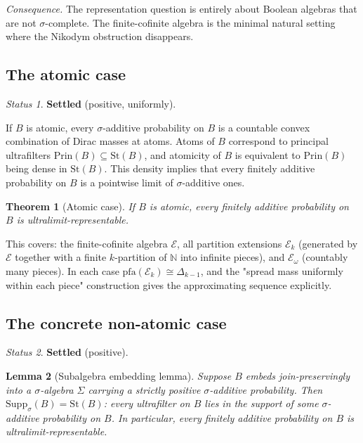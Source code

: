 \documentclass[11pt]{article}
\newtheorem{theorem}{Theorem}
\newtheorem{lemma}[theorem]{Lemma}
\theoremstyle{definition}
\theoremstyle{remark}
\newtheorem*{status}{Status}
\newcommand{\N}{\mathbb{N}}
\newcommand{\St}{\mathrm{St}}
\newcommand{\Prin}{\mathrm{Prin}}
\newcommand{\Supp}{\mathrm{Supp}_\sigma}
\newcommand{\pfa}{\mathrm{pfa}}
\begin{document}
\noindent
\textit{Consequence.} The representation question is entirely about Boolean algebras
that are not $\sigma$-complete. The finite-cofinite algebra is the minimal natural
setting where the Nikodym obstruction disappears.

\subsection{The atomic case}

\begin{status}
\textbf{Settled} (positive, uniformly).
\end{status}

If $B$ is atomic, every $\sigma$-additive probability on $B$ is a countable convex
combination of Dirac masses at atoms. Atoms of $B$ correspond to principal
ultrafilters $\Prin(B) \subseteq \St(B)$, and atomicity of $B$ is equivalent to
$\Prin(B)$ being dense in $\St(B)$. This density implies that every finitely
additive probability on $B$ is a pointwise limit of $\sigma$-additive ones.

\begin{theorem}[Atomic case]
If $B$ is atomic, every finitely additive probability on $B$ is ultralimit-representable.
\end{theorem}

This covers: the finite-cofinite algebra $\mathcal{E}$, all partition extensions
$\mathcal{E}_k$ (generated by $\mathcal{E}$ together with a finite $k$-partition of
$\N$ into infinite pieces), and $\mathcal{E}_\omega$ (countably many pieces). In
each case $\pfa(\mathcal{E}_k) \cong \Delta_{k-1}$, and the "spread mass uniformly
within each piece" construction gives the approximating sequence explicitly.

\subsection{The concrete non-atomic case}

\begin{status}
\textbf{Settled} (positive).
\end{status}

\begin{lemma}[Subalgebra embedding lemma]
Suppose $B$ embeds join-preservingly into a $\sigma$-algebra $\Sigma$ carrying a
strictly positive $\sigma$-additive probability. Then $\Supp(B) = \St(B)$: every
ultrafilter on $B$ lies in the support of some $\sigma$-additive probability on $B$.
In particular, every finitely additive probability on $B$ is ultralimit-representable.
\end{lemma}
\end{document}

